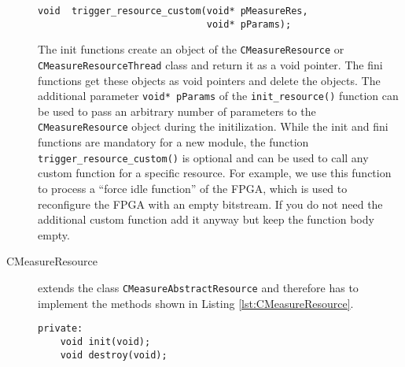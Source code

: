 \begin{description}
\begin{lstlisting}[caption={Interface that each plugin must implement.\added[id=ck]{Listing aktualisiert.}}, label=lst:ResourceInterface]
void  trigger_resource_custom(void* pMeasureRes,
							  void* pParams);
	\end{lstlisting}
	The init functions create an object of the \texttt{CMeasureResource} or \\ \texttt{CMeasureResourceThread} class and return it as a void pointer. The fini functions get these objects as void pointers and delete the objects.
	The additional parameter \texttt{void* pParams} of the \texttt{init\_resource()} function can be used to pass an arbitrary number of parameters to the \\\texttt{CMeasureResource} object during the initilization.   While the init and fini functions are mandatory for a new module, the function \texttt{trigger\_resource\_custom()} is optional and can be used to call any custom function for a specific resource. For example, we use this function to process a ``force idle function'' of the FPGA, which is used to reconfigure the FPGA with an empty bitstream. If you do not need the additional custom function add it anyway but keep the function body empty.
	
	\item[CMeasureResource] extends the class \texttt{CMeasureAbstractResource} and therefore has to implement the methods shown in Listing \ref{lst:CMeasureResource}.  
	\begin{lstlisting}[caption={Methods of the \texttt{CMeasureResource} class that programmers have to implement in order to support a new resource. \added[id=ck]{Listing aktualisiert.}}, label=lst:CMeasureResource]
private:
	void init(void);
	void destroy(void);
	

\end{lstlisting}
\end{description}
